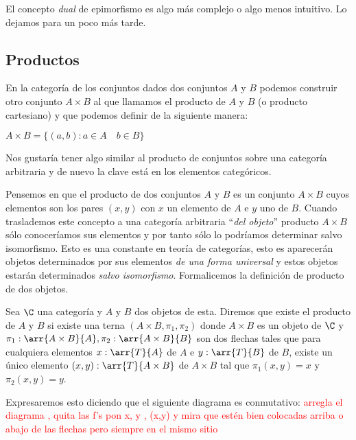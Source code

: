 El concepto \emph{dual} de epimorfismo es algo más complejo o algo menos intuitivo. Lo dejamos para un poco más tarde.

\subsection{Productos}
En la categoría de los conjuntos dados dos conjuntos $A$ y $B$
podemos construir otro conjunto $A \times B$ al que llamamos el
producto de $A$ y $B$ (o producto cartesiano) y que podemos
definir de la siguiente manera:

\begin{definition*}
	$A\times B = \{ (a, b) : a \in A \quad b \in B \}$
\end{definition*}

Nos gustaría tener algo similar al producto de conjuntos sobre una
categoría arbitraria y de nuevo la clave está en los elementos categóricos.

Pensemos en que el producto de dos conjuntos $A$ y $B$ es un conjunto $A\times B$ cuyos elementos son los pares $(x,y)$ con $x$ un elemento de $A$ e $y$ uno de $B$.  Cuando traslademos este concepto a una categoría arbitraria ``\emph{del objeto}''  producto $A\times B$ sólo conoceríamos sus elementos y por tanto sólo lo podríamos determinar salvo isomorfismo. Esto es una constante en teoría de categorías, esto es aparecerán objetos determinados por sus elementos \emph{de una forma universal} y estos objetos estarán determinados \emph{salvo isomorfismo}.  Formalicemos la definición de producto de dos objetos.

\begin{definition*}
	Sea $\C$ una categoría y $A$ y $B$ dos objetos de esta. Diremos que
	existe el producto de $A$ y $B$
	si existe una terna $(A\times B, \pi_1, \pi_2)$
	donde $A\times B$ es un objeto de $\C$ y
	$\pi_1 : \arr{A\times B}{A}, \pi_2 : \arr{A\times B}{B}$ son dos flechas tales
	que para cualquiera elementos $x : \arr{T}{A}$ de $A$ e
	$y: \arr{T}{B}$ de $B$, existe un único elemento
	$(x,y): \arr{T}{A\times B}$ de $A\times B$ tal que $\pi_1 (x,y)=x$ y $\pi_2(x,y)=y$.

	Expresaremos esto diciendo que  el siguiente diagrama es conmutativo: \textcolor{red}{arregla el diagrama , quita las f's pon x, y , (x,y) y mira que estén bien colocadas arriba o abajo de las flechas pero siempre en el mismo sitio}
	\begin{center}
	\end{center}
\end{definition*}


